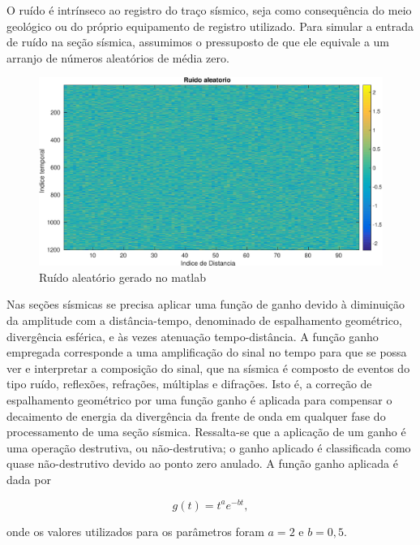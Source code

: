 O ruído é intrínseco ao registro do traço sísmico, seja como consequência do meio geológico ou do próprio equipamento de registro utilizado. Para simular a entrada de ruído na seção sísmica, assumimos o pressuposto de que ele equivale a um arranjo de números aleatórios de média zero.

\begin{figure}[H]
\centering
\includegraphics[totalheight=7.0cm]{figuras/cap3/ruido_aletorio.eps}
\caption{Ruído aleatório gerado no matlab}
\label{fig:ruido_aletorio}
\end{figure}

Nas seções sísmicas se precisa aplicar uma função de ganho devido à diminuição da amplitude com a distância-tempo, denominado de  espalhamento geométrico, divergência esférica, e às vezes atenuação tempo-distância. 
A função ganho empregada corresponde a uma amplificação do sinal no tempo para que se possa ver e interpretar a composição do sinal, que na sísmica é composto de eventos do tipo ruído, reflexões, refrações, múltiplas e difrações. 
Isto é, a correção de espalhamento geométrico por uma função ganho é aplicada para compensar o decaimento de energia da divergência da frente de onda em qualquer fase do processamento de uma seção sísmica. 
Ressalta-se que a aplicação de um ganho é uma operação destrutiva, ou não-destrutiva; o ganho aplicado é classificada como quase não-destrutivo devido ao ponto zero anulado.
A função ganho aplicada é dada por 

\begin{equation}
g(t)=t^{a}e^{-bt},
\label{eq:figura_ganho}
\end{equation}

onde os valores utilizados para os parâmetros foram $a=2$ e $b=0,5$.

